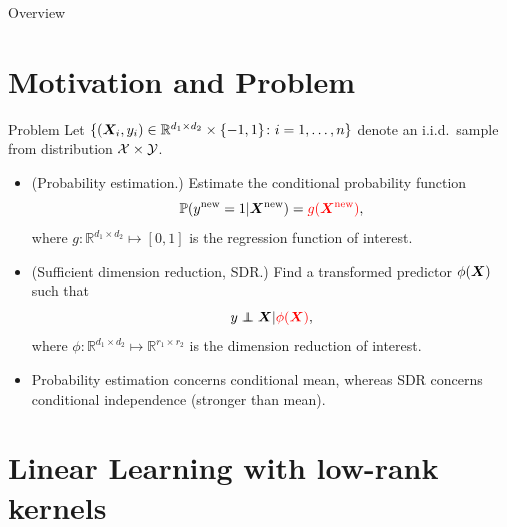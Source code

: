 \documentclass[compress,dvipsnames]{beamer}
\let\olditem\item
\renewcommand\item{\olditem\justifying}
\newcommand{\ind}{\perp\!\!\!\!\perp}
\begin{document}
\begin{frame}{Overview}
\tableofcontents
\end{frame}

\section{Motivation and Problem}
\begin{frame}{Problem}
Let $\{ (\bm{X}_i, y_i) \in \mathbb{R}^{d_1\times d_2}\times \{-1,1\}\colon i=1,\ldots,n\}$ denote an i.i.d.\ sample from distribution ${\mathcal X}\times {\mathcal Y}$. 
\begin{itemize}
\item (Probability estimation.) Estimate the conditional probability function
\[
\mathbb{P}(y^{\text{new}}=1|\bm{X}^{\text{new}})={\color{red}g(\bm{X}^{\text{new}})},
\]
where $g\colon \mathbb{R}^{d_1\times d_2}\mapsto [0,1]$ is the regression function of interest. 
\item (Sufficient dimension reduction, SDR.) Find a transformed predictor $\phi(\bm{X})$ such that
\[
y \ind \mX \large|{\color{red}\phi(\mX)},
\]
where $\phi\colon \mathbb{R}^{d_1\times d_2}\mapsto \mathbb{R}^{r_1\times r_2}$ is the dimension reduction of interest. 
\item Probability estimation concerns {\color{red}conditional mean}, whereas SDR concerns {\color{red}conditional independence} (stronger than mean). 
\end{itemize}
\end{frame}

\section{Linear Learning with low-rank kernels}
\end{document}

